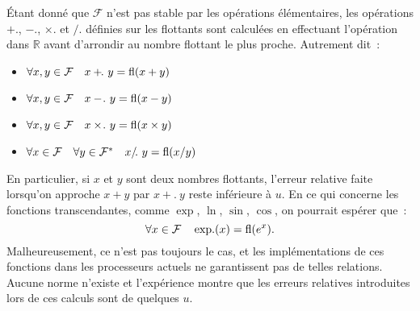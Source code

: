 \documentclass{article}
\newcommand{\R}{\mathbb{R}}
\newcommand{\fl}[1]{{\rm fl}(#1)}
\begin{document}
Étant donné que $\mathcal{F}$ n'est pas stable par les opérations élémentaires,
les opérations $+\!\!.$, $-\!.$, $\times\!.$ et $/\!.$ définies sur les
flottants sont calculées en effectuant l'opération dans $\R$ avant d'arrondir
au nombre flottant le plus proche. Autrement dit~:
\begin{itemize}
	\item $\forall x,y\in\mathcal{F} \quad x +\!\!.\ y = \fl{x+y}$
	\item $\forall x,y\in\mathcal{F} \quad x -\!.\ y = \fl{x-y}$
	\item $\forall x,y\in\mathcal{F} \quad x \times\!.\ y = \fl{x\times y}$
	\item $\forall x\in\mathcal{F} \quad \forall y\in\mathcal{F}^* \quad
	  x /\!.\ y = \fl{x/y}$
\end{itemize}
En particulier, si $x$ et $y$ sont deux nombres flottants, l'erreur relative
faite lorsqu'on approche $x+y$ par $x + \!\!.\ y$ reste inférieure à $u$.
En ce qui concerne les fonctions transcendantes, comme $\exp$, $\ln$,
$\sin$, $\cos$, on pourrait espérer que~:
\[\forall x\in\mathcal{F} \quad \exp\!.(x)=\fl{e^x}.\]
Malheureusement, ce n'est pas toujours le cas, et les implémentations de ces
fonctions dans les processeurs actuels ne garantissent pas de telles
relations. Aucune norme n'existe et l'expérience montre que les erreurs
relatives introduites lors de ces calculs sont de quelques $u$.\\
\end{document}
